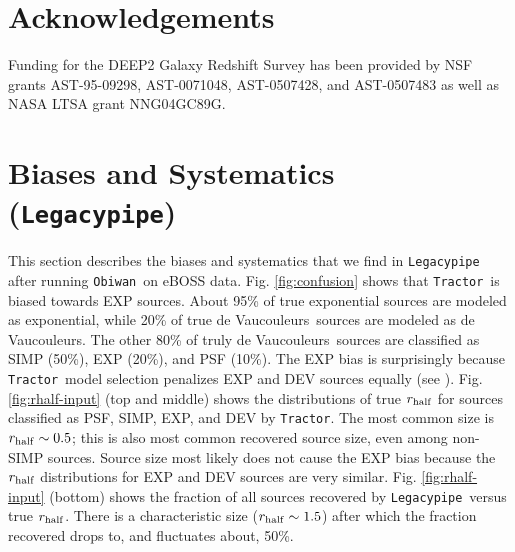 \documentclass[a4paper,fleqn,usenatbib]{mnras}
\newcommand{\rhalf}{r_{\rm{half}}}
\newcommand{\tractor}{{\tt Tractor}}
\newcommand{\legacypipe}{{\tt Legacypipe}}
\newcommand{\obiwan}{{\tt Obiwan}}
\newcommand{\dev}{de Vaucouleurs}
\begin{document}
\section*{Acknowledgements} 
\label{sec:ack}

Funding for the DEEP2 Galaxy Redshift Survey has been provided by NSF grants AST-95-09298, AST-0071048, AST-0507428, and AST-0507483 as well as NASA LTSA grant NNG04GC89G.
 
 








\appendix

\section{Biases and Systematics (\legacypipe)}
\label{sec:biases-systematics}

This section describes the biases and systematics that we find in \legacypipe\, after running \obiwan\, on eBOSS data. Fig. \ref{fig:confusion} shows that \tractor\, is biased towards EXP sources. About 95\% of true exponential sources are modeled as exponential, while 20\% of true \dev\, sources are modeled as \dev. The other 80\% of truly \dev\, sources are classified as SIMP (50\%), EXP (20\%), and PSF (10\%). The EXP bias is surprisingly because \tractor\, model selection penalizes EXP and DEV sources equally (see \citealt{obiwanMethods}).
Fig. \ref{fig:rhalf-input} (top and middle) shows the distributions of true $\rhalf$ for sources classified as PSF, SIMP, EXP, and DEV by \tractor. The most common size is $\rhalf \sim 0.5$\arcsec; this is also most common recovered source size, even among non-SIMP sources. Source size most likely does not cause the EXP bias because the $\rhalf$ distributions for EXP and DEV sources are very similar. 
Fig. \ref{fig:rhalf-input} (bottom) shows the fraction of all sources recovered by \legacypipe\, versus true $\rhalf$. There is a characteristic size ($\rhalf \sim 1.5$\arcsec) after which the fraction recovered drops to, and fluctuates about, 50\%.
\end{document}
